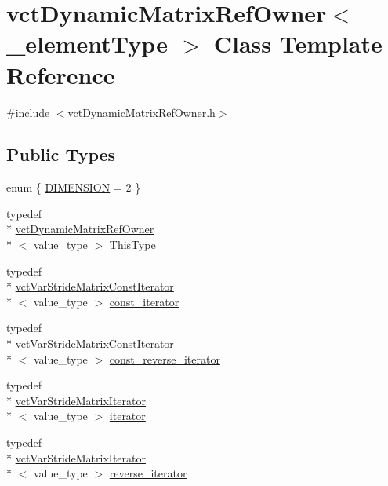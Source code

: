 \hypertarget{classvct_dynamic_matrix_ref_owner}{\section{vct\-Dynamic\-Matrix\-Ref\-Owner$<$ \-\_\-element\-Type $>$ Class Template Reference}
\label{classvct_dynamic_matrix_ref_owner}
}


{\ttfamily \#include $<$vct\-Dynamic\-Matrix\-Ref\-Owner.\-h$>$}

\subsection*{Public Types}
\begin{DoxyCompactItemize}
\item 
enum \{ \hyperlink{classvct_dynamic_matrix_ref_owner_af13d59ea37e2deaafd66ed04d22db916ae19d71a7e9eb96879fbbe0b8acea6fae}{D\-I\-M\-E\-N\-S\-I\-O\-N} = 2
 \}
\item 
typedef \\*
\hyperlink{classvct_dynamic_matrix_ref_owner}{vct\-Dynamic\-Matrix\-Ref\-Owner}\\*
$<$ value\-\_\-type $>$ \hyperlink{classvct_dynamic_matrix_ref_owner_a004c89da7faff7d573988fc3b9ec43d9}{This\-Type}
\item 
typedef \\*
\hyperlink{classvct_var_stride_matrix_const_iterator}{vct\-Var\-Stride\-Matrix\-Const\-Iterator}\\*
$<$ value\-\_\-type $>$ \hyperlink{classvct_dynamic_matrix_ref_owner_a7a8df19473cc2e95e25c4d1bf4bacbe4}{const\-\_\-iterator}
\item 
typedef \\*
\hyperlink{classvct_var_stride_matrix_const_iterator}{vct\-Var\-Stride\-Matrix\-Const\-Iterator}\\*
$<$ value\-\_\-type $>$ \hyperlink{classvct_dynamic_matrix_ref_owner_a50c3b985899b0d6cb2f9fab9f8305207}{const\-\_\-reverse\-\_\-iterator}
\item 
typedef \\*
\hyperlink{classvct_var_stride_matrix_iterator}{vct\-Var\-Stride\-Matrix\-Iterator}\\*
$<$ value\-\_\-type $>$ \hyperlink{classvct_dynamic_matrix_ref_owner_aaf9f6aaf86c05aec0bcd354d40c11863}{iterator}
\item 
typedef \\*
\hyperlink{classvct_var_stride_matrix_iterator}{vct\-Var\-Stride\-Matrix\-Iterator}\\*
$<$ value\-\_\-type $>$ \hyperlink{classvct_dynamic_matrix_ref_owner_a133b22e9f6b4e7a20998ad3db72ed6c3}{reverse\-\_\-iterator}
\end{DoxyCompactItemize}
